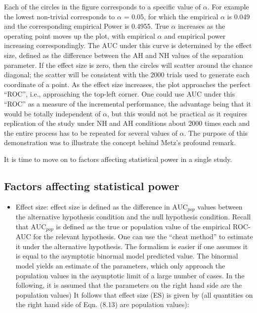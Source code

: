 \documentclass[
]{book}
\providecommand{\tightlist}{%
  \setlength{\itemsep}{0pt}\setlength{\parskip}{0pt}}
\begin{document}
Each of the circles in the figure corresponds to a specific value of \(\alpha\). For example the lowest non-trivial corresponds to \(\alpha\) = 0.05, for which the empirical \(\alpha\) is 0.049 and the corresponding empirical Power is 0.4955. True \(\alpha\) increases as the operating point moves up the plot, with empirical \(\alpha\) and empirical power increasing correspondingly. The \(\text{AUC}\) under this curve is determined by the effect size, defined as the difference between the AH and NH values of the separation parameter. If the effect size is zero, then the circles will scatter around the chance diagonal; the scatter will be consistent with the 2000 trials used to generate each coordinate of a point. As the effect size increases, the plot approaches the perfect ``ROC'', i.e., approaching the top-left corner. One could use AUC under this ``ROC'' as a measure of the incremental performance, the advantage being that it would be totally independent of \(\alpha\), but this would not be practical as it requires replication of the study under NH and AH conditions about 2000 times each and the entire process has to be repeated for several values of \(\alpha\). The purpose of this demonstration was to illustrate the concept behind Metz's profound remark.

It is time to move on to factors affecting statistical power in a single study.

\hypertarget{factors-affecting-statistical-power}{%
\subsection{Factors affecting statistical power}\label{factors-affecting-statistical-power}}

\begin{itemize}
\tightlist
\item
  Effect size: effect size is defined as the difference in \(\text{AUC}_{pop}\) values between the alternative hypothesis condition and the null hypothesis condition. Recall that \(\text{AUC}_{pop}\) is defined as the true or population value of the empirical ROC-AUC for the relevant hypothesis. One can use the ``cheat method'' to estimate it under the alternative hypothesis. The formalism is easier if one assumes it is equal to the asymptotic binormal model predicted value. The binormal model yields an estimate of the parameters, which only approach the population values in the asymptotic limit of a large number of cases. In the following, it is assumed that the parameters on the right hand side are the population values)
  It follows that effect size (ES) is given by (all quantities on the right hand side of Eqn. (8.13) are population values):
\end{itemize}
\end{document}
